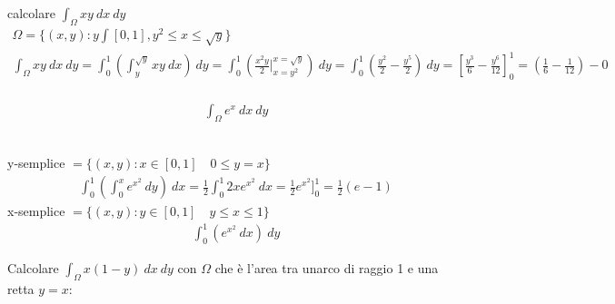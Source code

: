 \documentclass[a4paper, oneside]{article}
\begin{document}
\begin{example}
    calcolare $\int_{\Omega} xy \ dx \ dy$
    \begin{gather*}
        \Omega = \{(x,y): y \int [0,1], y^2\leq x \leq \sqrt{y} \}\\
        \int_{\Omega} xy \ dx \ dy = \int_{0}^{1} \left( \int_{y}^{\sqrt{y}} xy \ dx \right) \ dy = \int_{0}^{1} \left( \frac{x^2 y}{2} |_{x=y^2}^{x=\sqrt{y}} \right) \ dy = \int_{0}^{1} \left( \frac{y^2}{2} - \frac{y^5}{2} \right) \ dy = \left[ \frac{y^3}{6} - \frac{y^6}{12} \right]^1_0 = \left( \frac{1}{6}- \frac{1}{12} \right) - 0  \\ 
    \end{gather*}
\end{example}
\begin{example}
    \begin{center}
        \begin{gather*}
            \int_{\Omega} e^x \ dx \ dy
        \end{gather*}
    \end{center}
    \hfil\\
    y-semplice  $= \{(x,y): x \in[0,1] \quad 0 \leq y = x\}$
    \begin{gather*}
        \int_{0}^{1} \left( \int_{0}^{x} e^{x^2}\ dy \right) \ dx = \frac{1}{2} \int_{0}^{1} 2x e^{x^2} \ dx = \frac{1}{2} e^{x^2} ]_0^1 = \frac{1}{2} (e-1) 
    \end{gather*}
    x-semplice $= \{(x,y): y \in[0,1] \quad y \leq x \leq 1\}$
    \begin{gather*}
        \int_{0}^{1} \left( e^{x^2} \ dx \right) \ dy 
    \end{gather*}
\end{example}
\begin{example}
    Calcolare $\int_{\Omega} x(1-y) \ dx \ dy$ con $\Omega$ che è l'area tra unarco di raggio 1 e una retta $y=x$:
    \begin{center}
    \end{center}
\end{example}
\end{document}
